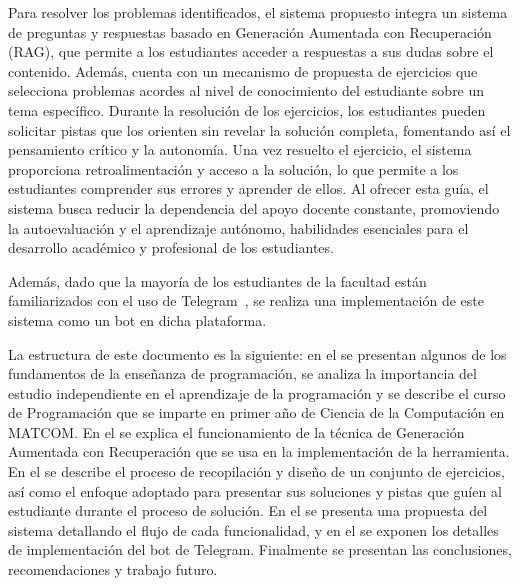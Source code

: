 Para resolver los problemas identificados, el sistema propuesto integra un sistema de preguntas y respuestas basado en Generación Aumentada con Recuperación (RAG), que permite a los estudiantes acceder a respuestas a sus dudas sobre el contenido. Además, cuenta con un mecanismo de propuesta de ejercicios que selecciona problemas acordes al nivel de conocimiento del estudiante sobre un tema específico. Durante la resolución de los ejercicios, los estudiantes pueden solicitar pistas que los orienten sin revelar la solución completa, fomentando así el pensamiento crítico y la autonomía. Una vez resuelto el ejercicio, el sistema proporciona retroalimentación y acceso a la solución, lo que permite a los estudiantes comprender sus errores y aprender de ellos. Al ofrecer esta guía, el sistema busca reducir la dependencia del apoyo docente constante, promoviendo la autoevaluación y el aprendizaje autónomo, habilidades esenciales para el desarrollo académico y profesional de los estudiantes.

Además, dado que la mayoría de los estudiantes de la facultad están familiarizados con el uso de Telegram~\cite{Telegram}, se realiza una implementación de este sistema como un bot en dicha plataforma.

La estructura de este documento es la siguiente: en el  se presentan algunos de los fundamentos de la enseñanza de programación, se analiza la importancia del estudio independiente en el aprendizaje de la programación y se describe el curso de Programación que se imparte en primer año de Ciencia de la Computación en \mbox{MATCOM}. En el  se explica el funcionamiento de la técnica de Generación Aumentada con Recuperación que se usa en la implementación de la herramienta. En el  se describe el proceso de recopilación y diseño de un conjunto de ejercicios, así como el enfoque adoptado para presentar sus soluciones y pistas que guíen al estudiante durante el proceso de solución. En el  se presenta una propuesta del sistema detallando el flujo de cada funcionalidad, y en el  se exponen los detalles de implementación del bot de Telegram. Finalmente se presentan las conclusiones, recomendaciones y trabajo futuro.